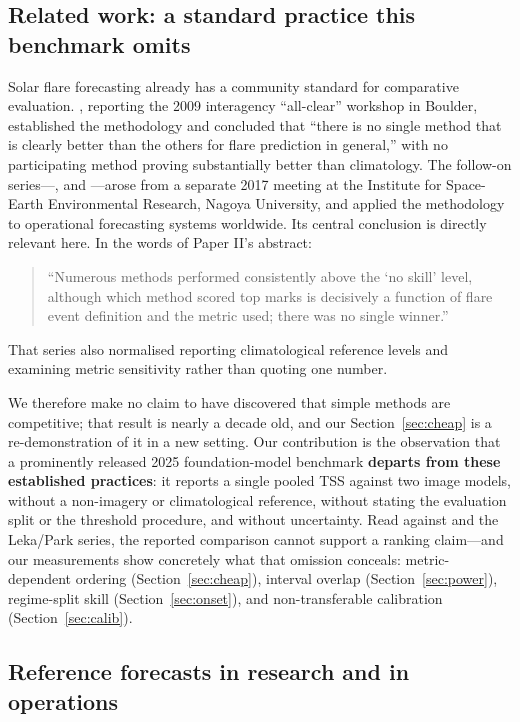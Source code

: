 \documentclass[11pt]{article}
\begin{document}
\subsection{Related work: a standard practice this benchmark omits}

Solar flare forecasting already has a community standard for comparative
evaluation. \citet{barnes2016}, reporting the 2009 interagency ``all-clear''
workshop in Boulder, established the methodology and concluded that ``there is no
single method that is clearly better than the others for flare prediction in
general,'' with no participating method proving substantially better than
climatology. The follow-on series---\citet{leka2019b},
\citet{leka2019c} and \citet{park2020}---arose from a separate 2017 meeting at
the Institute for Space-Earth Environmental Research, Nagoya University, and
applied the methodology to operational forecasting systems worldwide. Its central
conclusion is directly relevant here. In the words of Paper II's abstract:

\begin{quote}
``Numerous methods performed consistently above the `no skill' level, although
which method scored top marks is decisively a function of flare event definition
and the metric used; there was no single winner.''
\end{quote}

That series also normalised reporting climatological reference levels and
examining metric sensitivity rather than quoting one number.

We therefore make no claim to have discovered that simple methods are
competitive; that result is nearly a decade old, and our
Section~\ref{sec:cheap} is a re-demonstration of it in a new setting. Our
contribution is the observation that a prominently released 2025
foundation-model benchmark \textbf{departs from these established practices}: it
reports a single pooled TSS against two image models, without a non-imagery or
climatological reference, without stating the evaluation split or the threshold
procedure, and without uncertainty. Read against \citet{barnes2016} and the
Leka/Park series, the reported comparison cannot support a ranking claim---and
our measurements show concretely what that omission conceals: metric-dependent
ordering (Section~\ref{sec:cheap}), interval overlap
(Section~\ref{sec:power}), regime-split skill (Section~\ref{sec:onset}), and
non-transferable calibration (Section~\ref{sec:calib}).

\subsection{Reference forecasts in research and in operations}
\end{document}
